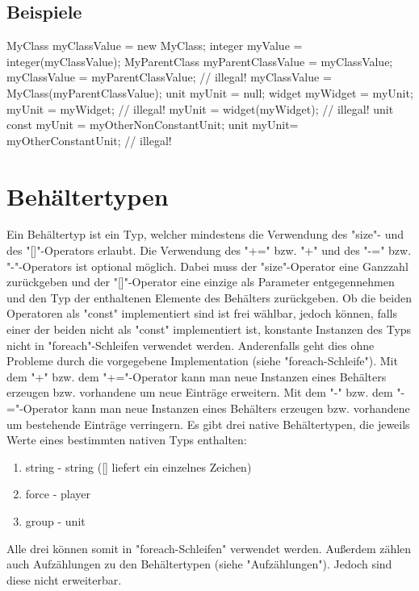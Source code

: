 \subsection{Beispiele}
MyClass myClassValue = new MyClass;
integer myValue = integer(myClassValue);
MyParentClass myParentClassValue = myClassValue;
myClassValue = myParentClassValue; // illegal!
myClassValue = MyClass(myParentClassValue);
unit myUnit = null;
widget myWidget = myUnit;
myUnit = myWidget; // illegal!
myUnit = widget(myWidget); // illegal!
unit const myUnit = myOtherNonConstantUnit;
unit myUnit= myOtherConstantUnit; // illegal!

\section{Behältertypen}
Ein Behältertyp ist ein Typ, welcher mindestens die Verwendung des "size"- und des "[]"-Operators erlaubt.
Die Verwendung des "+=" bzw. "+" und des "-=" bzw. "-"-Operators ist optional möglich.
Dabei muss der "size"-Operator eine Ganzzahl zurückgeben und der "[]"-Operator eine einzige als
Parameter entgegennehmen und den Typ der enthaltenen Elemente des Behälters zurückgeben.
Ob die beiden Operatoren als "const" implementiert sind ist frei wählbar, jedoch können, falls
einer der beiden nicht als "const" implementiert ist, konstante Instanzen des Typs nicht in
"foreach"-Schleifen verwendet werden.
Anderenfalls geht dies ohne Probleme durch die vorgegebene Implementation (siehe "foreach-Schleife").
Mit dem "+" bzw. dem "+="-Operator kann man neue Instanzen eines Behälters erzeugen bzw. vorhandene um neue Einträge erweitern.
Mit dem "-" bzw. dem "-="-Operator kann man neue Instanzen eines Behälters erzeugen bzw. vorhandene um bestehende Einträge verringern.
Es gibt drei native Behältertypen, die jeweils Werte eines bestimmten nativen Typs enthalten:
\begin{enumerate}
\item string - string ([] liefert ein einzelnes Zeichen)
\item force - player
\item group - unit
\end{enumerate}

Alle drei können somit in "foreach-Schleifen" verwendet werden.
Außerdem zählen auch Aufzählungen zu den Behältertypen (siehe "Aufzählungen"). Jedoch sind diese nicht erweiterbar.

